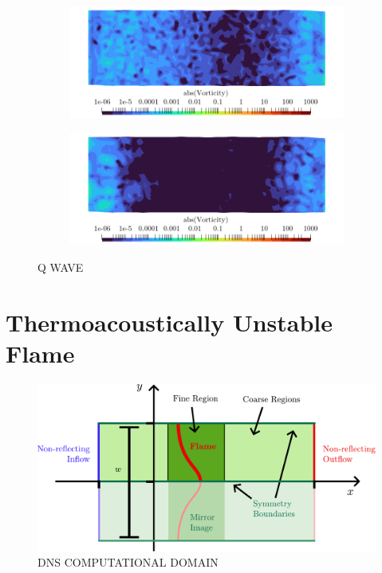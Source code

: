 \begin{figure}[t]
    \begin{subfigure}{0.49\textwidth}
    \centering
    \includegraphics[scale=0.325]{assets/graphs/double-instab.0005.png}
    \caption{}
    \label{fig:qwave3}
    \end{subfigure}
    \begin{subfigure}{0.49\textwidth}
    \centering
    \includegraphics[scale=0.325]{assets/graphs/double-instab.0006.png}
    \caption{}
    \label{fig:qwave4}
    \end{subfigure}
\caption{Q WAVE}
\label{fig:qwave}
\end{figure}







\section{Thermoacoustically Unstable Flame}

\begin{figure}[t]
\centering
\includegraphics[scale=0.65]{assets/imgs/DNS-computational-domain.pdf}
\caption{DNS COMPUTATIONAL DOMAIN}
\label{fig:DNS-domain}
\end{figure}

